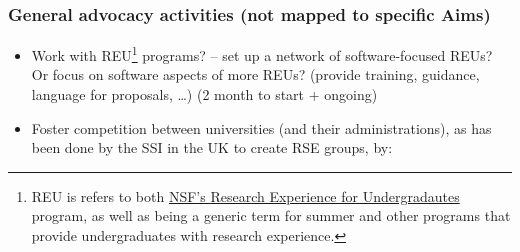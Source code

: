 \documentclass[
]{book}
\begin{document}
\hypertarget{general-advocacy-activities-not-mapped-to-specific-aims}{%
\subsubsection{General advocacy activities (not mapped to specific Aims)}\label{general-advocacy-activities-not-mapped-to-specific-aims}}

\begin{itemize}
\item
  Work with REU\footnote{REU is refers to both \href{https://www.nsf.gov/crssprgm/reu/}{NSF's Research Experience for Undergradautes}
    program, as well as being a generic term for summer and other programs that provide undergraduates with research experience.}
  programs? -- set up a network of software-focused REUs? Or focus on software
  aspects of more REUs? (provide training, guidance, language for proposals, \ldots)
  (2 month to start + ongoing)
\item
  Foster competition between universities (and their administrations), as has been done by
  the SSI in the UK to create RSE groups, by:


\end{itemize}
\end{document}
